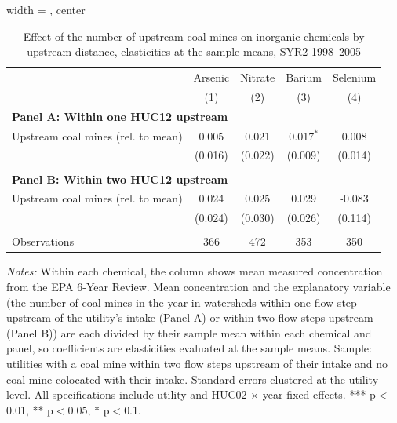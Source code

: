 \begin{table}[htbp]
   
   \caption{\label{tab:6yr_huc02fe_inorg_ravalli_2005_k2_elas_mines} Effect of the number of upstream coal mines on inorganic chemicals by upstream distance, elasticities at the sample means, SYR2 1998--2005}
   \bigskip
   
   \centering
   
\begin{adjustbox}{width = \textwidth, center}
   \begin{tabular}{lcccc}
      \toprule
       & Arsenic & Nitrate & Barium & Selenium \\
                                         & (1)     & (2)     & (3)         & (4)\\  
      \midrule 
      \multicolumn{5}{l}{\textbf{Panel A: Within one HUC12 upstream}} \\
      Upstream coal mines (rel. to mean) & 0.005   & 0.021   & 0.017$^{*}$ & 0.008\\   
                                         & (0.016) & (0.022) & (0.009)     & (0.014)\\   
       \\
      \midrule 
      \multicolumn{5}{l}{\textbf{Panel B: Within two HUC12 upstream}} \\
      Upstream coal mines (rel. to mean) & 0.024   & 0.025   & 0.029   & -0.083\\   
                                         & (0.024) & (0.030) & (0.026) & (0.114)\\   
       \\
      Observations                       & 366     & 472     & 353     & 350\\  
      \bottomrule
   \end{tabular}
\end{adjustbox}
   
   {\tiny\linespread{1}\selectfont \par \raggedright 
   \textit{Notes:} Within each chemical, the column shows mean measured concentration from the EPA 6-Year Review. Mean concentration and the explanatory variable (the number of coal mines in the year in watersheds within one flow step upstream of the utility's intake (Panel A) or within two flow steps upstream (Panel B)) are each divided by their sample mean within each chemical and panel, so coefficients are elasticities evaluated at the sample means. Sample: utilities with a coal mine within two flow steps upstream of their intake and no coal mine colocated with their intake. Standard errors clustered at the utility level. All specifications include utility and HUC02 $\times$ year fixed effects. *** p$<$0.01, ** p$<$0.05, * p$<$0.1.}
   
\end{table}


